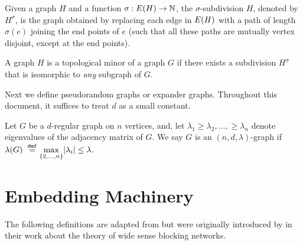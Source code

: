\documentclass[11pt]{article}
\newcommand{\EnDeeLambda}{(n, d, \lambda)}
\newcommand{\Subdivision}[2]{{#1}^{#2}}
\newcommand{\ExpansionFactor}[1]{\lambda(#1)}
\begin{document}
\begin{definition}\label{def:subdivisions}
Given a graph $H$ and a function $\sigma: E(H) \rightarrow \mathbb{N}$, the $\sigma$-subdivision $H$, denoted by $\Subdivision{H}{\sigma}$, is the graph obtained by replacing each edge in $E(H)$ with a path of length $\sigma(e)$ joining the end points of $e$ (such that all these paths are mutually vertex disjoint, except at the end points).	
\end{definition}

\begin{definition}\label{def:topological-minor}
A graph $H$ is a topological minor of a graph $G$ if there exists a subdivision $\Subdivision{H}{\sigma}$ that is isomorphic to \emph{any} subgraph of $G$.	
\end{definition}

Next we define pseudorandom graphs or expander graphs. 
Throughout this document, it suffices to treat $d$ as a small constant.

\begin{definition}[$\EnDeeLambda$ pseudorandom graphs]\label{def:expander-graphs}
Let $G$ be a $d$-regular graph on $n$ vertices, and, let $\lambda_1 \geq \lambda_2, \dots, \geq \lambda_n$ denote eigenvalues of the adjacency matrix of $G$.
We say $G$ is an $\EnDeeLambda$-graph if $\ExpansionFactor{\Graph} \Def \underset{{\{2, \dots, n\}}}{\max}|\lambda_i| \leq \lambda$.
\end{definition}


\begin{lemma}\label{lemma:expanders-mixing-lemma}
	
\end{lemma}


\section{Embedding Machinery}

The following definitions are adapted from \citep{nenadov2023routing} but were originally introduced by \citet{feldman1988wide} in their work about the theory of wide sense blocking networks.
\end{document}
